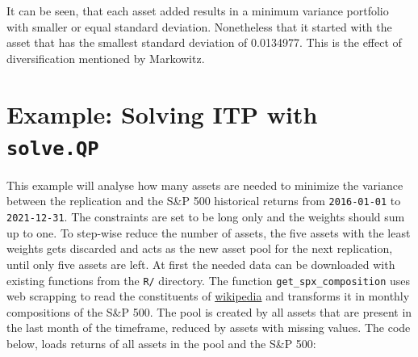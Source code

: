 \documentclass[
  oneside]{book}
\begin{document}
It can be seen, that each asset added results in a minimum variance portfolio with smaller or equal standard deviation. Nonetheless that it started with the asset that has the smallest standard deviation of 0.0134977. This is the effect of diversification mentioned by Markowitz.

\hypertarget{example-solving-itp-with-solve.qp}{%
\section{\texorpdfstring{Example: Solving ITP with \texttt{solve.QP}}{Example: Solving ITP with solve.QP}}\label{example-solving-itp-with-solve.qp}}

This example will analyse how many assets are needed to minimize the variance between the replication and the S\&P 500 historical returns from \texttt{2016-01-01} to \texttt{2021-12-31}. The constraints are set to be long only and the weights should sum up to one. To step-wise reduce the number of assets, the five assets with the least weights gets discarded and acts as the new asset pool for the next replication, until only five assets are left. At first the needed data can be downloaded with existing functions from the \texttt{R/} directory. The function \texttt{get\_spx\_composition} uses web scrapping to read the constituents of \href{https://en.wikipedia.org/wiki/List_of_S\%26P_500_companies}{wikipedia} and transforms it in monthly compositions of the S\&P 500. The pool is created by all assets that are present in the last month of the timeframe, reduced by assets with missing values. The code below, loads returns of all assets in the pool and the S\&P 500:
\end{document}
